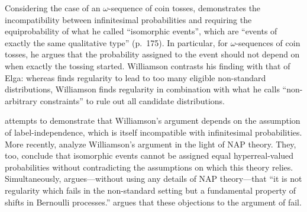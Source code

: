 Considering the case of an $\omega$-sequence of coin tosses, \citet{Williamson:2007} demonstrates the incompatibility between infinitesimal probabilities and requiring the equiprobability of what he called ``isomorphic events'', which are ``events of exactly the same qualitative type'' (p.~175). In particular, for $\omega$-sequences of coin tosses, he argues that the probability assigned to the event should not depend on when exactly the tossing started.
Williamson contrasts his finding with that of Elga: whereas \citet{Elga:2004} finds regularity to lead to too many eligible non-standard distributions, Williamson finds regularity in combination with what he calls ``non-arbitrary constraints'' to rule out all candidate distributions.

\citet{Weintraub:2008} attempts to demonstrate that Williamson's argument depends on the assumption of label-independence, which is itself incompatible with infinitesimal probabilities.
More recently, \citet{Benci_etal:2018} analyze Williamson's argument in the light of NAP theory. They, too, conclude that isomorphic events cannot be assigned equal hyper\-real-valued probabilities without contradicting the assumptions on which this theory relies.
Simultaneously, \citet{Howson:2017} argues---without using any details of NAP theory---that ``it is not regularity which fails in the non-standard setting but a fundamental property of shifts in Bernoulli processes.'' \citet{Parker:unpubl} argues that these objections to the argument of \citet{Williamson:2007} fail.

